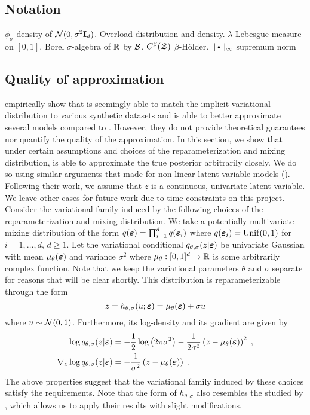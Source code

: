 \documentclass[10pt]{article}
\begin{document}
\subsection{Notation}

\todo $\phi_\sigma$ density of $\mathcal{N}(0,\sigma^2\mathbf{I}_d)$. Overload distribution and density. $\lambda$ Lebesgue measure on $[0,1]$. Borel $\sigma$-algebra of $\mathbb{R}$ by $\mathcal{B}$. $C^\beta(\mathcal{Z})$ $\beta$-H\"{o}lder. $\|\argdot\|_\infty$ supremum norm

\subsection{Quality of approximation}

\citet{Titsias:2019} empirically show that \uivi is seemingly able to match the implicit variational distribution to various synthetic datasets and is able to better approximate several models compared to \sivi. However, they do not provide theoretical guarantees nor quantify the quality of the \uivi approximation. In this section, we show that under certain assumptions and choices of the reparameterization and mixing distribution, \uivi is able to approximate the true posterior arbitrarily closely. We do so using similar arguments that \citet{Plummer:2021} made for non-linear latent variable models (\nllvm). Following their work, we assume that $z$ is a continuous, univariate latent variable. We leave other cases for future work due to time constraints on this project.
\\

Consider the \uivi variational family induced by the following choices of the reparameterization and mixing distribution. We take a potentially multivariate mixing distribution of the form $q(\bm{\varepsilon})=\prod_{i=1}^dq(\bm{\varepsilon}_i)$ where $q(\bm{\varepsilon}_i)=\mathrm{Unif}(0,1)$ for $i=1,\ldots,d$, $d\geq 1$. Let the variational conditional $q_{\theta,\sigma}(z|\bm{\varepsilon})$ be univariate Gaussian with mean $\mu_\theta(\bm{\varepsilon})$ and variance $\sigma^2$ where $\mu_\theta:[0,1]^d\rightarrow\mathbb{R}$ is some arbitrarily complex function. Note that we keep the variational parameters $\theta$ and $\sigma$ separate for reasons that will be clear shortly. This distribution is reparameterizable through the form
\[
z = h_{\theta,\sigma}(u;\bm{\varepsilon}) = \mu_\theta(\bm{\varepsilon}) + \sigma u
\]
where $u\sim \mathcal{N}(0,1)$. Furthermore, its log-density and its gradient are given by
\begin{align*}
\log q_{\theta,\sigma}(z|\bm{\varepsilon}) &= -\frac{1}{2}\log\left(2\pi\sigma^2\right)-\frac{1}{2\sigma^2}\left(z-\mu_\theta(\bm{\varepsilon})\right)^2 \;, \\
\nabla_z \log q_{\theta,\sigma}(z|\bm{\varepsilon}) &= -\frac{1}{\sigma^2}\left(z-\mu_\theta(\bm{\varepsilon})\right) \;.
\end{align*}
The above properties suggest that the variational family induced by these choices satisfy the \uivi requirements. Note that the form of $h_{\theta,\sigma}$ also resembles the \nllvm studied by \citet{Plummer:2021}, which allows us to apply their results with slight modifications.
\\
\end{document}
